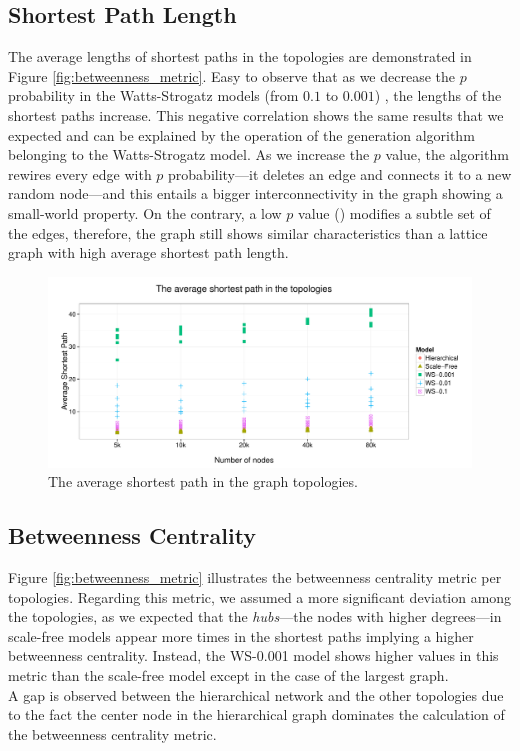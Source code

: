 \subsection{Shortest Path Length}

The average lengths of shortest paths in the topologies are demonstrated in Figure \ref{fig:betweenness_metric}. Easy to observe that as we decrease the $p$ probability in the Watts-Strogatz models (from $0.1$ to $0.001$) , the lengths of the shortest paths increase. This negative correlation shows the same results that we expected and can be explained by the operation of the generation algorithm belonging to the Watts-Strogatz model. As we increase the $p$ value, the algorithm rewires every edge with $p$ probability---\ie it deletes an edge and connects it to a new random node---and this entails a bigger interconnectivity in the graph showing a small-world property. On the contrary, a low $p$ value () modifies a subtle set of the edges, therefore, the graph still shows similar characteristics than a lattice graph with high average shortest path length.

\begin{figure}[!ht]
	\centering
	\includegraphics[width=160mm, keepaspectratio]{figures/avg_sp_metric.pdf}
	\caption{The average shortest path in the graph topologies.}
	\label{fig:avg_shortest_path}
\end{figure}

\subsection{Betweenness Centrality}

Figure \ref{fig:betweenness_metric} illustrates the betweenness centrality metric per topologies. Regarding this metric, we assumed a more significant deviation among the topologies, as we expected that the \emph{hubs}---the nodes with higher degrees---in scale-free models appear more times in the shortest paths implying a higher betweenness centrality. Instead, the WS-0.001 model shows higher values in this metric than the scale-free model except in the case of the largest graph.\\
A gap is observed between the hierarchical network and the other topologies due to the fact the center node in the hierarchical graph dominates the calculation of the betweenness centrality metric.

